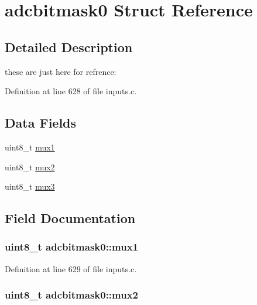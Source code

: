 \hypertarget{structadcbitmask0}{\section{adcbitmask0 Struct Reference}
\label{structadcbitmask0}
}


\subsection{Detailed Description}
these are just here for refrence\-: 

Definition at line 628 of file inputs.\-c.

\subsection*{Data Fields}
\begin{DoxyCompactItemize}
\item 
uint8\-\_\-t \hyperlink{structadcbitmask0_a3fbffd3d7e87298b265d6235ffbb5d04}{mux1}
\item 
uint8\-\_\-t \hyperlink{structadcbitmask0_a8c265eb01c678c7ec3d945bfa07dfb16}{mux2}
\item 
uint8\-\_\-t \hyperlink{structadcbitmask0_a843117489b46c20f0125704863f92091}{mux3}
\end{DoxyCompactItemize}


\subsection{Field Documentation}
\hypertarget{structadcbitmask0_a3fbffd3d7e87298b265d6235ffbb5d04}{
\subsubsection[{mux1}]{\setlength{\rightskip}{0pt plus 5cm}uint8\-\_\-t adcbitmask0\-::mux1}}\label{structadcbitmask0_a3fbffd3d7e87298b265d6235ffbb5d04}


Definition at line 629 of file inputs.\-c.

\hypertarget{structadcbitmask0_a8c265eb01c678c7ec3d945bfa07dfb16}{
\subsubsection[{mux2}]{\setlength{\rightskip}{0pt plus 5cm}uint8\-\_\-t adcbitmask0\-::mux2}}\label{structadcbitmask0_a8c265eb01c678c7ec3d945bfa07dfb16}


